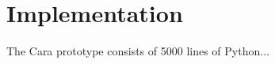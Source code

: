 \documentclass[letterpaper, anonymous, twocolumn, 10pt]{article}
\begin{document}



\section{Implementation} \label{section:implementation}
The Cara prototype consists of 5000 lines of Python...
\end{document}
